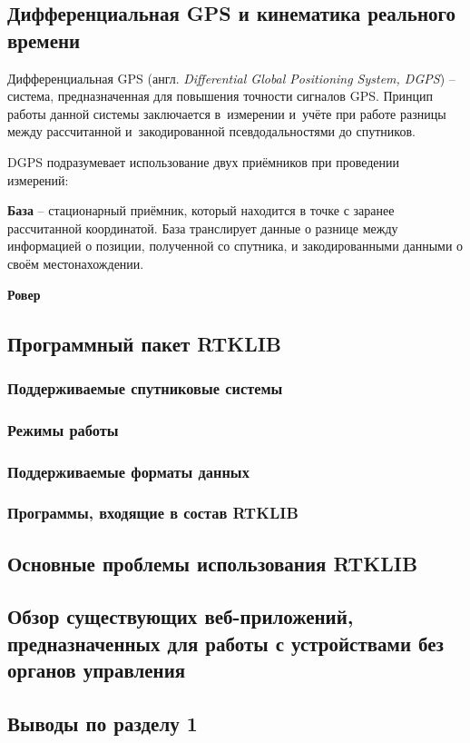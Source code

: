 
\subsection{Дифференциальная GPS и кинематика реального времени}

Дифференциальная GPS (англ. \emph{Differential Global Positioning System, DGPS}) -- система, предназначенная для повышения точности сигналов GPS. Принцип работы данной системы заключается в~измерении и~учёте при работе разницы между рассчитанной и~закодированной псевдодальностями до спутников. \par

DGPS подразумевает использование двух приёмников при проведении измерений:

\begin{dashitemize}
  \item \textbf{База} -- стационарный приёмник, который находится в точке с заранее рассчитанной координатой. База транслирует данные о разнице между информацией о позиции, полученной со спутника, и закодированными данными о своём местонахождении.
  \item \textbf{Ровер}
\end{dashitemize}

\subsection{Программный пакет RTKLIB}
\subsubsection{Поддерживаемые спутниковые системы}
\subsubsection{Режимы работы}
\subsubsection{Поддерживаемые форматы данных}
\subsubsection{Программы, входящие в состав RTKLIB}

\subsection{Основные проблемы использования RTKLIB}

\subsection{Обзор существующих веб-приложений, предназначенных для работы с устройствами без органов управления}

\subsection{Выводы по разделу 1}

\newpage
